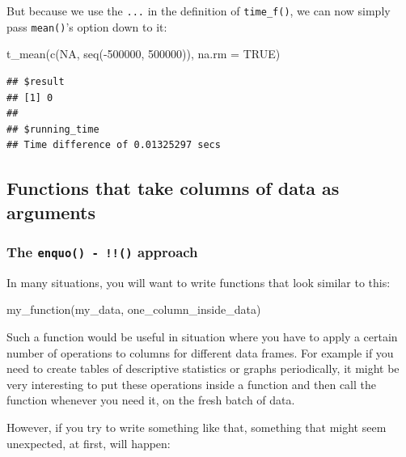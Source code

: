 \documentclass[
]{article}
\newenvironment{Shaded}{\begin{snugshade}}{\end{snugshade}}
\newcommand{\AttributeTok}[1]{\textcolor[rgb]{0.77,0.63,0.00}{#1}}
\newcommand{\ConstantTok}[1]{\textcolor[rgb]{0.00,0.00,0.00}{#1}}
\newcommand{\DecValTok}[1]{\textcolor[rgb]{0.00,0.00,0.81}{#1}}
\newcommand{\FunctionTok}[1]{\textcolor[rgb]{0.00,0.00,0.00}{#1}}
\newcommand{\NormalTok}[1]{#1}
\newcommand{\SpecialCharTok}[1]{\textcolor[rgb]{0.00,0.00,0.00}{#1}}
\begin{document}
But because we use the \texttt{...} in the definition of \texttt{time\_f()}, we can now simply pass \texttt{mean()}'s option down to it:

\begin{Shaded}
\begin{Highlighting}[]
\FunctionTok{t\_mean}\NormalTok{(}\FunctionTok{c}\NormalTok{(}\ConstantTok{NA}\NormalTok{, }\FunctionTok{seq}\NormalTok{(}\SpecialCharTok{{-}}\DecValTok{500000}\NormalTok{, }\DecValTok{500000}\NormalTok{)), }\AttributeTok{na.rm =} \ConstantTok{TRUE}\NormalTok{)}
\end{Highlighting}
\end{Shaded}

\begin{verbatim}
## $result
## [1] 0
## 
## $running_time
## Time difference of 0.01325297 secs
\end{verbatim}

\hypertarget{functions-that-take-columns-of-data-as-arguments}{%
\subsection{Functions that take columns of data as arguments}\label{functions-that-take-columns-of-data-as-arguments}}

\hypertarget{the-enquo---approach}{%
\subsubsection{\texorpdfstring{The \texttt{enquo()\ -\ !!()} approach}{The enquo() - !!() approach}}\label{the-enquo---approach}}

In many situations, you will want to write functions that look similar to this:

\begin{Shaded}
\begin{Highlighting}[]
\FunctionTok{my\_function}\NormalTok{(my\_data, one\_column\_inside\_data)}
\end{Highlighting}
\end{Shaded}

Such a function would be useful in situation where you have to apply a certain number of operations
to columns for different data frames. For example if you need to create tables of descriptive
statistics or graphs periodically, it might be very interesting to put these operations inside a
function and then call the function whenever you need it, on the fresh batch of data.

However, if you try to write something like that, something that might seem unexpected, at first,
will happen:
\end{document}
